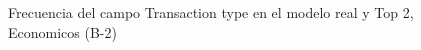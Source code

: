 \begin{figure}[H]
    \centering
    
    \caption{Frecuencia del campo Transaction type en el modelo real y Top 2, Economicos (B-2)}
    \label{frecuency-Transaction Type-top2}
\end{figure}